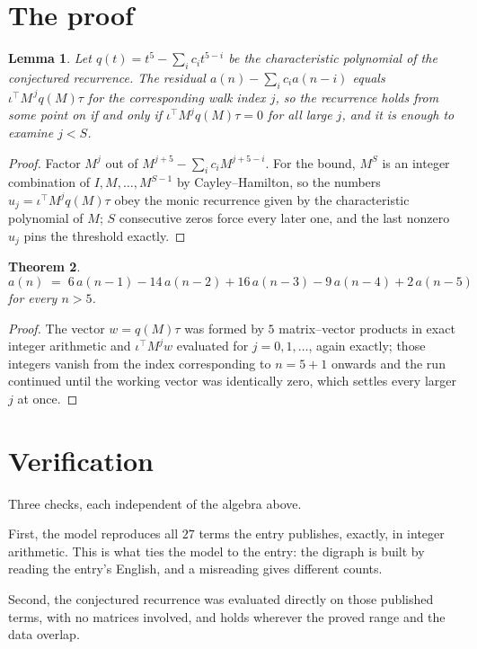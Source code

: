 \documentclass[11pt,a4paper]{article}
\theoremstyle{plain}
\newtheorem{theorem}{Theorem}
\newtheorem{lemma}[theorem]{Lemma}
\theoremstyle{definition}
\begin{document}
\section{The proof}

\begin{lemma}\label{lem:crit}
Let $q(t)=t^{5}-\sum_i c_it^{5-i}$ be the characteristic polynomial of the
conjectured recurrence. The residual $a(n)-\sum_ic_ia(n-i)$ equals
$\iota^{\!\top}M^{\,j}q(M)\tau$ for the corresponding walk index $j$, so the recurrence
holds from some point on if and only if $\iota^{\!\top}M^{j}q(M)\tau=0$ for all large $j$,
and it is enough to examine $j<S$.
\end{lemma}

\begin{proof}
Factor $M^{j}$ out of $M^{j+5}-\sum_ic_iM^{j+5-i}$. For the bound, $M^{S}$
is an integer combination of $I,M,\dots,M^{S-1}$ by Cayley--Hamilton, so the numbers
$u_j=\iota^{\!\top}M^{j}q(M)\tau$ obey the monic recurrence given by the characteristic
polynomial of $M$; $S$ consecutive zeros force every later one, and the last nonzero $u_j$
pins the threshold exactly.
\end{proof}

\begin{theorem}
\[
a(n)\;=\;6\,a(n-1) - 14\,a(n-2) + 16\,a(n-3) - 9\,a(n-4) + 2\,a(n-5)
\]
for every $n>5$.
\end{theorem}

\begin{proof}
The vector $w=q(M)\tau$ was formed by $5$ matrix--vector products in exact integer
arithmetic and $\iota^{\!\top}M^{j}w$ evaluated for $j=0,1,\dots$, again exactly; those
integers vanish from the index corresponding to $n=5+1$ onwards and the run continued
until the working vector was identically zero, which settles every larger $j$ at once.
\end{proof}

\section{Verification}

Three checks, each independent of the algebra above.

First, the model reproduces all $27$ terms the entry publishes, exactly, in integer
arithmetic. This is what ties the model to the entry: the digraph is built by reading the
entry's English, and a misreading gives different counts.

Second, the conjectured recurrence was evaluated directly on those published terms, with no
matrices involved, and holds wherever the proved range and the data overlap.
\end{document}

